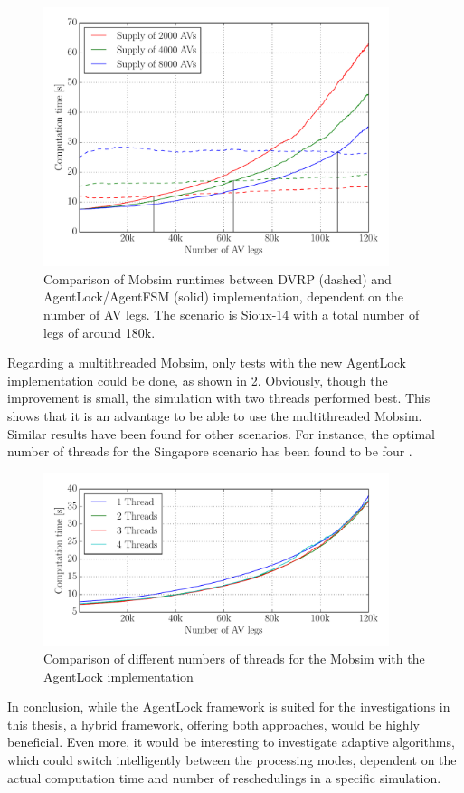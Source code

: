 \begin{figure}
    \centering
    \includegraphics[width=0.9\textwidth]{figures/dvrp_fsm.pdf}
    \caption{Comparison of Mobsim runtimes between DVRP (dashed) and AgentLock/AgentFSM (solid) implementation, dependent on the number of AV legs. The scenario is Sioux-14 with
    a total number of legs of around 180k.}
    \label{fig:dvrpfsm}
\end{figure}

Regarding a multithreaded Mobsim, only tests with the new AgentLock implementation
could be done, as shown in \cref{fig:threads}. Obviously, though the improvement
is small, the simulation with two threads performed best. This shows that it is
an advantage to be able to use the multithreaded Mobsim. Similar results
have been found for other scenarios. For instance, the optimal number of threads
for the Singapore scenario has been found to be four \citep{Erath2014}.

\begin{figure}
    \centering
    \includegraphics[width=0.9\textwidth]{figures/threads.pdf}
    \caption{Comparison of different numbers of threads for the Mobsim with the AgentLock implementation}
    \label{fig:threads}
\end{figure}

In conclusion, while the AgentLock framework is suited for the investigations in
this thesis, a hybrid framework, offering both approaches, would be highly beneficial.
Even more, it would be interesting
to investigate adaptive algorithms, which could switch intelligently between the
processing modes, dependent on the actual computation time and number of reschedulings
in a specific simulation.

